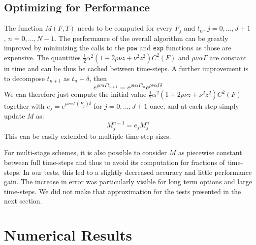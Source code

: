 \documentclass[]{rAMF2e}
\begin{document}
\subsection{Optimizing for Performance}
The function $M(F,T)$ needs to be computed for every $F_j$ and $t_n$, $j=0,...,J+1$, $n=0,...,N-1$. The performance of the overall algorithm can be greatly improved by minimizing the calls to the \texttt{pow} and \texttt{exp} functions as those are expensive. The quantities $\frac{1}{2} \alpha^2 (1+2\rho\nu z+ \nu^2 z^2) C^2(F)$ and $\rho\nu\alpha\Gamma$ are constant in time and can be thus be cached between time-steps. A further improvement is to decompose $t_{n+1}$ as $t_{n}+\delta$, then 
\begin{equation}
e^{\rho\nu\alpha\Gamma t_{n+1}}=e^{\rho\nu\alpha\Gamma t_n}e^{\rho\nu\alpha\Gamma \delta}
\end{equation}
We can therefore just compute the initial value $\frac{1}{2} \alpha^2 (1+2\rho\nu z+ \nu^2 z^2) C^2(F)$ together with $e_j = e^{\rho\nu\alpha\Gamma(F_j) \delta}$ for $j=0,...,J+1$ once, and at each step simply update $M$ as:
\begin{equation}
M_j^{n+1} = e_j M_j^{n} 
\end{equation}
This can be easily extended to multiple time-step sizes.

For multi-stage schemes, it is also possible to consider $M$ as piecewise constant between full time-steps and thus to avoid its computation for fractions of time-steps. In our tests, this led to a slightly decreased accuracy and little performance gain. The increase in error was particularly visible for long term options and large time-steps. We did not make that approximation for the tests presented in the next section.

\section{Numerical Results}
\end{document}
